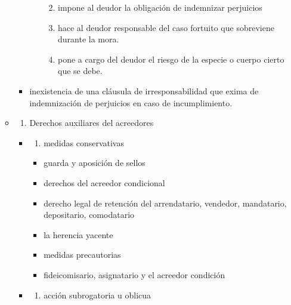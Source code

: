 \documentclass[]{article}
\providecommand{\tightlist}{%
  \setlength{\itemsep}{0pt}\setlength{\parskip}{0pt}}
\begin{document}
\begin{itemize}
\begin{itemize}
\begin{itemize}
\begin{itemize}
        \begin{enumerate}
        \def\labelenumi{\arabic{enumi}.}
        \tightlist
        \item
          impone al deudor la obligación de indemnizar perjuicios
        \item
          hace al deudor responsable del caso fortuito que sobreviene
          durante la mora.
        \item
          pone a cargo del deudor el riesgo de la especie o cuerpo
          cierto que se debe.
        \end{enumerate}
      \end{itemize}
    \item
      inexistencia de una cláusula de irresponsabilidad que exima de
      indemnización de perjuicios en caso de incumplimiento.
    \end{itemize}
  \item
    \begin{enumerate}
    \def\labelenumi{\arabic{enumi}.}
    \setcounter{enumi}{2}
    \tightlist
    \item
      Derechos auxiliares del acreedores
    \end{enumerate}

    \begin{itemize}
    \item
      \begin{enumerate}
      \def\labelenumi{\alph{enumi})}
      \tightlist
      \item
        medidas conservativas
      \end{enumerate}

      \begin{itemize}
      \tightlist
      \item
        guarda y aposición de sellos
      \item
        derechos del acreedor condicional
      \item
        derecho legal de retención del arrendatario, vendedor,
        mandatario, depositario, comodatario
      \item
        la herencia yacente
      \item
        medidas precautorias
      \item
        fideicomisario, asignatario y el acreedor condición
      \end{itemize}
    \item
      \begin{enumerate}
      \def\labelenumi{\alph{enumi})}
      \setcounter{enumi}{1}
      \tightlist
      \item
        acción subrogatoria u oblicua
      \end{enumerate}


\end{itemize}
\end{itemize}
\end{itemize}
\end{document}
